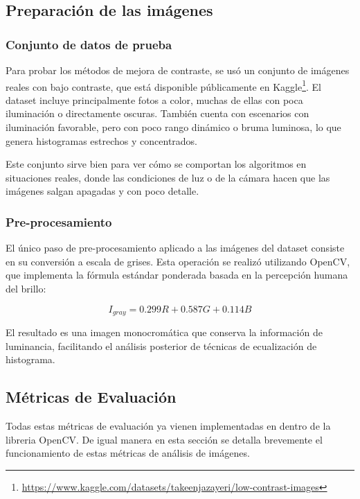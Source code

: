 \documentclass[sigchi]{acmart}
\begin{document}
\subsection{Preparación de las imágenes}
\label{subsec:preparacion}

\subsubsection{Conjunto de datos de prueba}

Para probar los métodos de mejora de contraste, se usó un conjunto de imágenes reales con bajo
contraste, que está disponible públicamente en
Kaggle\footnote{\url{https://www.kaggle.com/datasets/takeenjazayeri/low-contrast-images}}. El
dataset incluye principalmente fotos a color, muchas de ellas con poca iluminación o
directamente oscuras. También cuenta con escenarios con iluminación favorable, pero con poco
rango dinámico o bruma luminosa, lo que genera histogramas estrechos y concentrados.

Este conjunto sirve bien para ver cómo se comportan los algoritmos en situaciones reales, donde
las condiciones de luz o de la cámara hacen que las imágenes salgan apagadas y con poco
detalle.

\subsubsection{Pre-procesamiento}

El único paso de pre-procesamiento aplicado a las imágenes del dataset consiste en su
conversión a escala de grises. Esta operación se realizó utilizando OpenCV, que implementa la
fórmula estándar ponderada basada en la percepción humana del brillo:

\begin{equation}
	I_{gray} = 0.299R + 0.587G + 0.114B
\end{equation}

El resultado es una imagen monocromática que conserva la información de luminancia, facilitando
el análisis posterior de técnicas de ecualización de histograma.

\subsection{Métricas de Evaluación}

Todas estas métricas de evaluación ya vienen implementadas en dentro de la libreria OpenCV. De igual manera
en esta sección se detalla brevemente el funcionamiento de estas métricas de análisis de imágenes.
\end{document}
